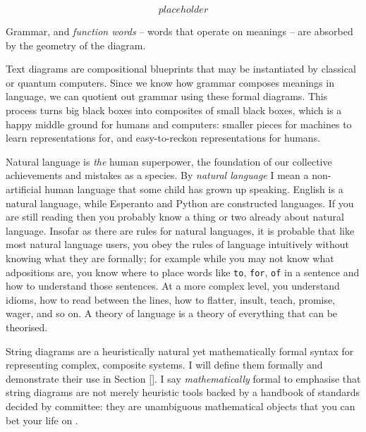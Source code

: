 \begin{marginfigure}
\centering
\[placeholder\]
\caption{Grammar, and \emph{function words} -- words that operate on meanings -- are absorbed by the geometry of the diagram.}
\end{marginfigure}


Text diagrams are compositional blueprints that may be instantiated by classical or quantum computers. Since we know how grammar composes meanings in language, we can quotient out grammar using these formal diagrams. This process turns big black boxes into composites of small black boxes, which is a happy middle ground for humans and computers: smaller pieces for machines to learn representations for, and easy-to-reckon representations for humans.


Natural language is \emph{the} human superpower, the foundation of our collective achievements and mistakes as a species. By \emph{natural language} I mean a non-artificial human language that some child has grown up speaking. English is a natural language, while Esperanto and Python are constructed languages. If you are still reading then you probably know a thing or two already about natural language. Insofar as there are rules for natural languages, it is probable that like most natural language users, you obey the rules of language intuitively without knowing what they are formally; for example while you may not know what adpositions are, you know where to place words like \texttt{to}, \texttt{for}, \texttt{of} in a sentence and how to understand those sentences. At a more complex level, you understand idioms, how to read between the lines, how to flatter, insult, teach, promise, wager, and so on. A theory of language is a theory of everything that can be theorised.


String diagrams are a heuristically natural yet mathematically formal syntax for representing complex, composite systems. I will define them formally and demonstrate their use in Section \ref{}. I say \emph{mathematically} formal to emphasise that string diagrams are not merely heuristic tools backed by a handbook of standards decided by committee: they are unambiguous mathematical objects that you can bet your life on \citep{joyal_geometry_1991,joyal_geometry_nodate,maclane_natural_1963,lane_categories_2010,selinger_survey_2010}.\\


